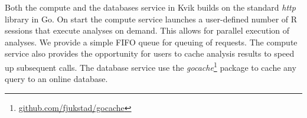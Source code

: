Both the compute and the databases service in Kvik builds on the standard
\emph{http} library in Go. On start the compute service 
launches a user-defined number of R sessions that execute analyses on demand.
This allows for parallel execution of analyses. We provide a simple FIFO queue
for queuing of requests. The compute service also provides the opportunity for users to
cache analysis results to speed up subsequent calls. The database service use
the \emph{gocache}\footnote{\url{github.com/fjukstad/gocache}} package to cache
any query to an online database.

% 
% 
% 
% 
% 
